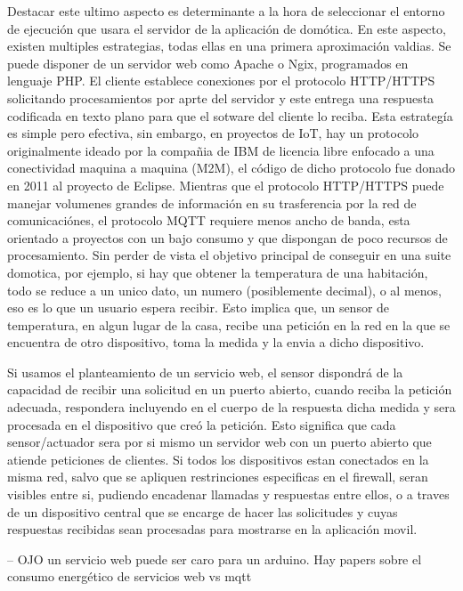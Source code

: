 Destacar este ultimo aspecto es determinante a la hora de seleccionar el entorno de ejecución que usara el servidor de la aplicación de domótica. En este aspecto, existen multiples estrategias, todas ellas en una primera aproximación valdias. Se puede disponer de un servidor web como Apache o Ngix, programados en lenguaje PHP. El cliente establece conexiones por el protocolo HTTP/HTTPS solicitando procesamientos por aprte del servidor y este entrega una respuesta codificada en texto plano para que el sotware del cliente lo reciba. Esta estrategía es simple pero efectiva, sin embargo, en proyectos de IoT, hay un protocolo originalmente ideado por la compañia de IBM de licencia libre enfocado a una conectividad maquina a maquina (M2M), el código de dicho protocolo fue donado en 2011 al proyecto de Eclipse. Mientras que el protocolo HTTP/HTTPS puede manejar volumenes grandes de información en su trasferencia por la red de comunicaciónes, el protocolo MQTT requiere menos ancho de banda, esta orientado a proyectos con un bajo consumo  y que dispongan de poco recursos de procesamiento. Sin perder de vista el objetivo principal de conseguir en una suite domotica, por ejemplo, si hay que obtener la temperatura de una habitación, todo se reduce a un unico dato, un numero (posiblemente decimal), o al menos, eso es lo que un usuario espera recibir. Esto implica que, un sensor de temperatura, en algun lugar de la casa, recibe una petición en la red en la que se encuentra de otro dispositivo, toma la medida y la envia a dicho dispositivo.

\vspace{1.5cm}

Si usamos el planteamiento de un servicio web, el sensor dispondrá de la capacidad de recibir una solicitud en un puerto abierto, cuando reciba la petición adecuada, respondera incluyendo en el cuerpo de la respuesta dicha medida y sera procesada en el dispositivo que creó la petición. Esto significa que cada sensor/actuador sera por si mismo un servidor web con un puerto abierto que atiende peticiones de clientes. Si todos los dispositivos estan conectados en la misma red, salvo que se apliquen restrinciones especificas en el firewall, seran visibles entre si, pudiendo encadenar llamadas y respuestas entre ellos, o a traves de un dispositivo central que se encarge de hacer las solicitudes y cuyas respuestas recibidas sean procesadas para mostrarse en la aplicación movil.

 -- OJO
 un servicio web puede ser caro para un arduino. Hay papers sobre el consumo energético de servicios web vs mqtt


